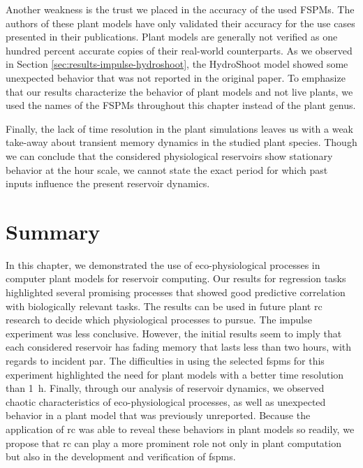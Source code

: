 Another weakness is the trust we placed in the accuracy of the used FSPMs.
The authors of these plant models have only validated their accuracy for the use cases presented in their publications.
Plant models are generally not verified as one hundred percent accurate copies of their real-world counterparts.
As we observed in Section \ref{sec:results-impulse-hydroshoot}, the HydroShoot model showed some unexpected behavior that was not reported in the original paper.
To emphasize that our results characterize the behavior of plant models and not live plants, we used the names of the FSPMs throughout this chapter instead of the plant genus. 

Finally, the lack of time resolution in the plant simulations leaves us with a weak take-away about transient memory dynamics in the studied plant species.
Though we can conclude that the considered physiological reservoirs show stationary behavior at the hour scale, we cannot state the exact period for which past inputs influence the present reservoir dynamics.



\section{Summary}

In this chapter, we demonstrated the use of eco-physiological processes in computer plant models for reservoir computing.
Our results for regression tasks highlighted several promising processes that showed good predictive correlation with biologically relevant tasks.
The results can be used in future plant \acrshort{rc} research to decide which physiological processes to pursue.
The impulse experiment was less conclusive.
However, the initial results seem to imply that each considered reservoir has fading memory that lasts less than two hours, with regards to incident \acrshort{par}.
The difficulties in using the selected \acrshort{fspm}s for this experiment highlighted the need for plant models with a better time resolution than \SI{1}{h}.
Finally, through our analysis of reservoir dynamics, we observed chaotic characteristics of eco-physiological processes, as well as unexpected behavior in a plant model that was previously unreported.
Because the application of \acrshort{rc} was able to reveal these behaviors in plant models so readily, we propose that \acrshort{rc} can play a more prominent role not only in plant computation but also in the development and verification of \acrshort{fspm}s.